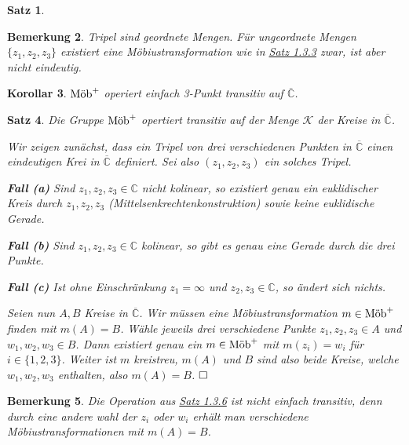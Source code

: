 \documentclass[11pt]{book}
\numberwithin{dummy}{section}
\newtheorem{theorem}{Satz}[section]
\newtheorem{corollary}[theorem]{Korollar}
\newtheorem{remark}[theorem]{Bemerkung}
\theoremstyle{nonumberbreak}
\newenvironment{pr}[1][]{\ifthenelse{\equal{#1}{}}{\proof}{\proof[#1]}\rm}{\endproof}
\newcommand{\C}{\mathbb{C}}
\newcommand{\CC}{\overline{\mathbb{C}}}
\newcommand{\mob}{\textup{Möb}^+}
\begin{document}
\begin{spacing}{1.4}
\begin{theorem}
\begin{pr}
\begin{compactenum}
\end{compactenum}

\end{pr}
\end{theorem}

\begin{remark}    %
Tripel sind geordnete Mengen. Für ungeordnete Mengen $\{z_1, z_2, z_3\}$ existiert eine Möbiustransformation wie in \hyperlink{satzeinsdreidrei}{Satz 1.3.3} zwar, ist aber nicht eindeutig.
\end{remark}


\begin{corollary}   %
$\mob$ operiert einfach 3-Punkt transitiv auf $\CC$.

\end{corollary}

\hypertarget{satzeinsdreisechs}{}
\begin{theorem}    %
Die Gruppe $\mob$ opertiert transitiv auf der Menge $\mathcal{K}$ der Kreise in $\CC$. 

\begin{pr}
Wir zeigen zunächst, dass ein Tripel von drei verschiedenen Punkten in $\CC$ einen eindeutigen Krei in $\CC$ definiert. Sei also $(z_1, z_2, z_3)$ ein solches Tripel.
\begin{compactenum}
\item[\textbf{Fall (a)}] Sind $z_1, z_2, z_3 \in \C$ nicht kolinear, so existiert genau ein euklidischer Kreis durch $z_1, z_2, z_3$ (Mittelsenkrechtenkonstruktion) sowie keine euklidische Gerade.
\item[\textbf{Fall (b)}] Sind $z_1, z_2, z_3 \in \C$ kolinear, so gibt es genau eine Gerade durch die drei Punkte.
\item[\textbf{Fall (c)}] Ist ohne Einschränkung $z_1= \infty$ und $z_2, z_3 \in \C$, so ändert sich nichts.
\end{compactenum}
Seien nun $A,B$ Kreise in $\CC$. Wir müssen eine Möbiustransformation $m \in \mob$ finden mit $m(A)=B$. Wähle jeweils drei verschiedene Punkte $z_1, z_2, z_3 \in A$ und $w_1, w_2, w_3 \in B$. Dann existiert genau ein $m \in \mob$ mit $m(z_i) = w_i$ für $i \in \{1,2,3\}$. Weiter ist $m$ kreistreu, $m(A)$ und $B$ sind also beide Kreise, welche $w_1, w_2, w_3$ enthalten, also $m(A) = B$. $\hfill \Box$


\end{pr}
\end{theorem}


\begin{remark}    %
Die Operation aus \hyperlink{satzeinsdreisechs}{Satz 1.3.6} ist nicht einfach transitiv, denn durch eine andere wahl der $z_i$ oder $w_i$ erhält man verschiedene Möbiustransformationen mit $m(A)=B$.


\end{remark}
\end{spacing}
\end{document}
